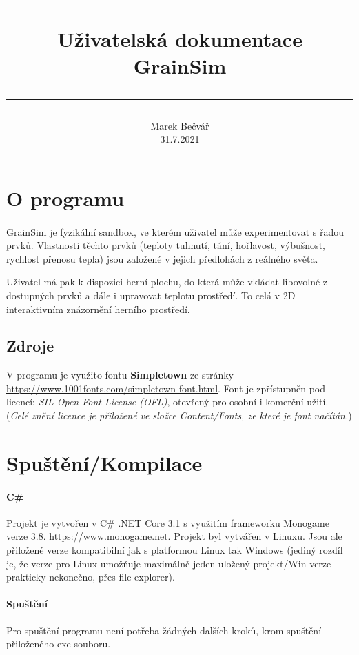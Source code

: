 \documentclass[a4paper, 12pt]{article}
\title{
        \vspace{1in}
        \rule{\linewidth}{0.5pt}
		\usefont{OT1}{bch}{b}{n}
        \huge Uživatelská dokumentace \\GrainSim\\
        \vspace{-10pt}
        \rule{\linewidth}{1pt}
}
\author{
		\normalfont\normalsize
        Marek Bečvář\\[-3pt]\normalsize
        31.7.2021
}
\date{}
\begin{document}
\maketitle 
\newpage

\tableofcontents
\newpage

\section{O programu} 
\paragraph{}
GrainSim je fyzikální sandbox, ve kterém uživatel může experimentovat s řadou 
prvků. Vlastnosti těchto prvků (teploty tuhnutí, tání, hořlavost, výbušnost, rychlost
přenosu tepla) jsou založené v jejich předlohách z reálného světa.

Uživatel má pak k dispozici herní plochu, do která může vkládat libovolné z
dostupných prvků a dále i upravovat teplotu prostředí. To celá v 2D interaktivním 
znázornění herního prostředí.

\subsection{Zdroje}
V programu je využito fontu \textbf{Simpletown} ze stránky\\
\url{https://www.1001fonts.com/simpletown-font.html}. 
Font je zpřístupněn pod licencí: \emph{SIL Open Font License (OFL)}, otevřený
pro osobní i komerční užití. \\\small{(\emph{Celé znění licence je přiložené ve
složce Content/Fonts, ze které je font načítán.})}


\section{Spuštění/Kompilace}
\paragraph{C\#}
Projekt je vytvořen v C\# .NET Core 3.1 s využitím frameworku Monogame verze 3.8.
\url{https://www.monogame.net}. Projekt byl vytvářen v Linuxu. Jsou ale
přiložené verze kompatibilní jak s platformou Linux tak Windows (jediný rozdíl je, že verze
pro Linux umožňuje maximálně jeden uložený projekt/Win verze prakticky
nekonečno, přes file explorer).

\paragraph{Spuštění}
Pro spuštění programu není potřeba žádných dalších kroků, krom spuštění
přiloženého exe souboru.
\end{document}
